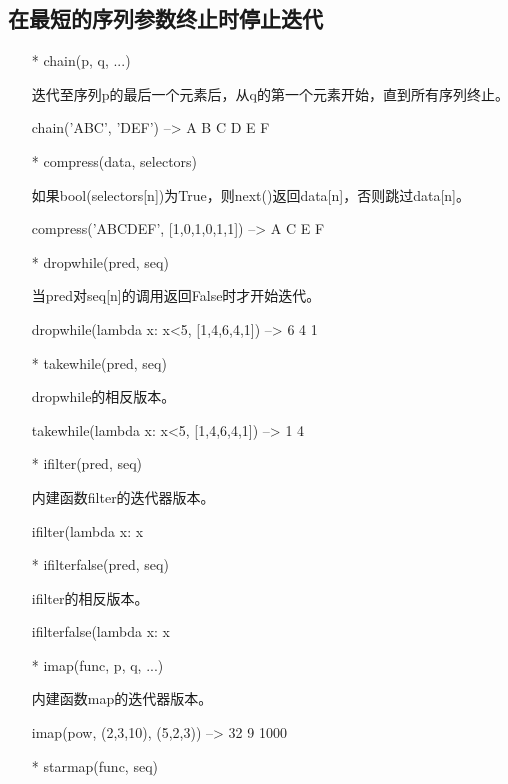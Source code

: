 \documentclass[12pt,a4paper]{report}
\begin{document}
\subsection{在最短的序列参数终止时停止迭代} 
\begin{itemize}
    \item[*]chain(p, q, ...)

    迭代至序列p的最后一个元素后，从q的第一个元素开始，直到所有序列终止。
        \begin{python}[moreemph={[4]42},caption={},label=ex1]
chain('ABC', 'DEF') --> A B C D E F
        \end{python}
    \item[*]compress(data, selectors)

    如果bool(selectors[n])为True，则next()返回data[n]，否则跳过data[n]。
        \begin{python}[moreemph={[4]42},caption={},label=ex1]
compress('ABCDEF', [1,0,1,0,1,1]) --> A C E F
        \end{python}
    \item[*]dropwhile(pred, seq)

    当pred对seq[n]的调用返回False时才开始迭代。
        \begin{python}[moreemph={[4]42},caption={},label=ex1]
dropwhile(lambda x: x<5, [1,4,6,4,1]) --> 6 4 1
        \end{python}
    \item[*]takewhile(pred, seq)

    dropwhile的相反版本。
        \begin{python}[moreemph={[4]42},caption={},label=ex1]
takewhile(lambda x: x<5, [1,4,6,4,1]) --> 1 4
        \end{python}
    \item[*]ifilter(pred, seq)

    内建函数filter的迭代器版本。
        \begin{python}[moreemph={[4]42},caption={},label=ex1]
ifilter(lambda x: x%
        \end{python}
    \item[*]ifilterfalse(pred, seq)

    ifilter的相反版本。
        \begin{python}[moreemph={[4]42},caption={},label=ex1]
ifilterfalse(lambda x: x%
        \end{python}
    \item[*]imap(func, p, q, ...)

    内建函数map的迭代器版本。
        \begin{python}[moreemph={[4]42},caption={},label=ex1]
imap(pow, (2,3,10), (5,2,3)) --> 32 9 1000
        \end{python}
    \item[*]starmap(func, seq)


\end{itemize}
\end{document}
